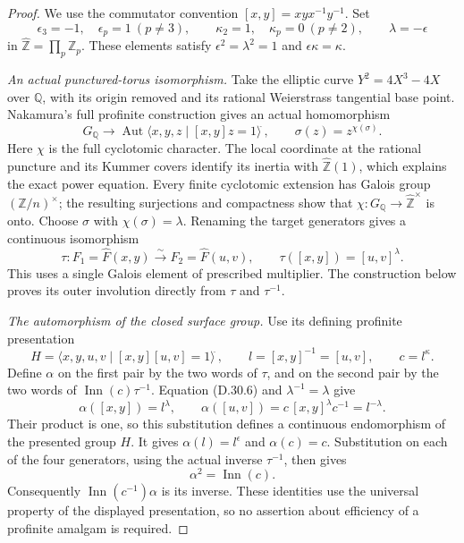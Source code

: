 \begin{proof}
We use the commutator convention $[x,y]=xyx^{-1}y^{-1}$.
Set
\[
 \epsilon_3=-1,\quad\epsilon_p=1\ (p\ne3),\qquad
 \kappa_2=1,\quad\kappa_p=0\ (p\ne2),\qquad
 \lambda=-\epsilon
                                                        \tag{D.30.4}
\]
in $\widehat{\mathbb Z}=\prod_p\mathbb Z_p$.  These elements
satisfy $\epsilon^2=\lambda^2=1$ and
$\epsilon\kappa=\kappa$.

\emph{An actual punctured-torus isomorphism.}
Take the elliptic curve $Y^2=4X^3-4X$ over $\mathbb Q$,
with its origin removed and its rational Weierstrass tangential
base point.  Nakamura's full profinite construction
\cite[\S1, equation (1.2), and \S2.5, p.~424]{C_Nakamura2013}
gives an actual homomorphism
\[
 G_{\mathbb Q}\longrightarrow\operatorname{Aut}
 \langle x,y,z\mid[x,y]z=1\rangle^{\widehat{\ }},
 \qquad \sigma(z)=z^{\chi(\sigma)}.
                                                        \tag{D.30.5}
\]
Here $\chi$ is the full cyclotomic character.  The local
coordinate at the rational puncture and its Kummer covers identify
its inertia with $\widehat{\mathbb Z}(1)$, which explains the exact
power equation.  Every finite cyclotomic extension has Galois group
$(\mathbb Z/n)^\times$; the resulting surjections and compactness
show that $\chi:G_{\mathbb Q}\to\widehat{\mathbb Z}^{\times}$
is onto.  Choose $\sigma$ with $\chi(\sigma)=\lambda$.
Renaming the target generators gives a continuous isomorphism
\[
 \tau:F_1=\widehat F(x,y)\xrightarrow{\sim}
       F_2=\widehat F(u,v),
 \qquad \tau([x,y])=[u,v]^\lambda.                     \tag{D.30.6}
\]
This uses a single Galois element of prescribed multiplier.
The construction below proves its outer involution directly from
$\tau$ and $\tau^{-1}$.

\emph{The automorphism of the closed surface group.}
Use its defining profinite presentation
\[
 H=\langle x,y,u,v\mid[x,y][u,v]=1\rangle^{\widehat{\ }},
 \qquad l=[x,y]^{-1}=[u,v],\qquad c=l^\kappa.           \tag{D.30.7}
\]
Define $\alpha$ on the first pair by the two words of $\tau$,
and on the second pair by the two words of
$\operatorname{Inn}(c)\tau^{-1}$.
Equation (D.30.6) and $\lambda^{-1}=\lambda$ give
\[
 \alpha([x,y])=l^\lambda,\qquad
 \alpha([u,v])=c\,[x,y]^\lambda c^{-1}=l^{-\lambda}.
\]
Their product is one, so this substitution defines a continuous
endomorphism of the presented group $H$.  It gives
$\alpha(l)=l^\epsilon$ and $\alpha(c)=c$.
Substitution on each of the four generators, using the actual inverse
$\tau^{-1}$, then gives
\[
                     \alpha^2=\operatorname{Inn}(c).
                                                        \tag{D.30.8}
\]
Consequently $\operatorname{Inn}(c^{-1})\alpha$ is its inverse.
These identities use the universal property of the displayed
presentation, so no assertion about efficiency of a profinite
amalgam is required.


\end{proof}

